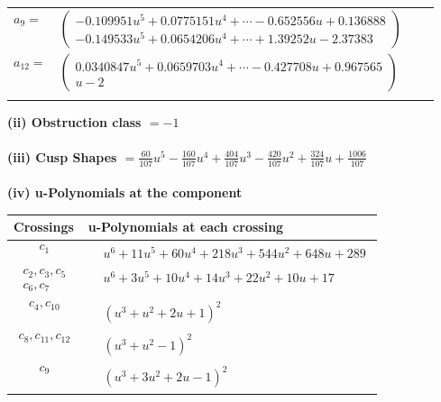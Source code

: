 \documentclass[1p]{elsarticle_modified}
\theoremstyle{definition}
\begin{document}
\begin{tabular}{m{7pt} m{180pt} m{7pt} m{180pt} }
\flushright $a_{9}=$&$\begin{pmatrix}-0.109951 u^{5}+0.0775151 u^{4}+\cdots-0.652556 u+0.136888\\-0.149533 u^{5}+0.0654206 u^{4}+\cdots+1.39252 u-2.37383\end{pmatrix}$ \\
\flushright $a_{12}=$&$\begin{pmatrix}0.0340847 u^{5}+0.0659703 u^{4}+\cdots-0.427708 u+0.967565\\u-2\end{pmatrix}$\\&\end{tabular}
\flushleft \textbf{(ii) Obstruction class $= -1$}\\~\\
\flushleft \textbf{(iii) Cusp Shapes $= \frac{60}{107} u^5-\frac{160}{107} u^4+\frac{404}{107} u^3-\frac{420}{107} u^2+\frac{324}{107} u+\frac{1006}{107}$}\\~\\
\newpage\renewcommand{\arraystretch}{1}
\flushleft \textbf{(iv) u-Polynomials at the component}\newline \\
\begin{tabular}{m{50pt}|m{274pt}}
Crossings & \hspace{64pt}u-Polynomials at each crossing \\
\hline $$\begin{aligned}c_{1}\end{aligned}$$&$\begin{aligned}
&u^6+11 u^5+60 u^4+218 u^3+544 u^2+648 u+289
\end{aligned}$\\
\hline $$\begin{aligned}c_{2},c_{3},c_{5}\\c_{6},c_{7}\end{aligned}$$&$\begin{aligned}
&u^6+3 u^5+10 u^4+14 u^3+22 u^2+10 u+17
\end{aligned}$\\
\hline $$\begin{aligned}c_{4},c_{10}\end{aligned}$$&$\begin{aligned}
&(u^3+u^2+2 u+1)^2
\end{aligned}$\\
\hline $$\begin{aligned}c_{8},c_{11},c_{12}\end{aligned}$$&$\begin{aligned}
&(u^3+u^2-1)^2
\end{aligned}$\\
\hline $$\begin{aligned}c_{9}\end{aligned}$$&$\begin{aligned}
&(u^3+3 u^2+2 u-1)^2
\end{aligned}$\\
\hline
\end{tabular}\\~\\
\end{document}
